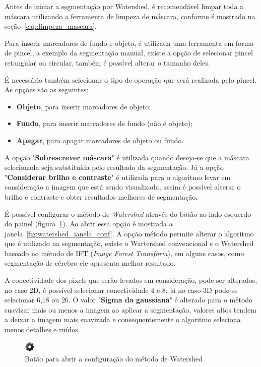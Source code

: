 Antes de iniciar a segmentação por Watershed, é recomendável limpar toda a máscara utilizando a ferramenta de limpeza de máscara, conforme é mostrado na seção~\ref{cap:limpeza_mascara}.

Para inserir marcadores de fundo e objeto, é utilizada uma ferramenta em forma de pincel, a exemplo da segmentação manual, existe a opção de selecionar pincel retangular ou circular, também é possível alterar o tamanho deles. 

É necessário também selecionar o tipo de operação que será realizada pelo pincel. As opções são as
seguintes:
\begin{itemize}
\item \textbf{Objeto}, para inserir marcadores de objeto;
\item \textbf{Fundo}, para inserir marcadores de fundo (não é objeto);
\item \textbf{Apagar}, para apagar marcadores de objeto ou fundo.
\end{itemize}

A opção "\textbf{Sobrescrever máscara}" é utilizada quando deseja-se que a máscara selecionada seja substituída pelo resultado da segmentação. Já a opção "\textbf{Considerar brilho e contraste}" é utilizada para o algoritmo levar em consideração a imagem que está sendo visualizada, assim é possível alterar o brilho e contraste e obter resultados melhores de segmentação.

É possível configurar o método de \textit{Watershed} através do botão ao lado esquerdo do painel (figura~\ref{fig:watershed_conf}). Ao abrir essa opção é mostrada a janela~\ref{fig:watershed_janela_conf}. A opção método permite alterar o algoritmo que é utilizado na segmentação, existe o Wartershed convencional e o Watershed baseado no método de IFT (\textit{Image Forest Transform}), em alguns casos, como segmentação de cérebro ele apresenta melhor resultado.

A conectividade dos pixels que serão levados em consideração, pode ser alterados, no caso 2D, é possível selecionar conectividade $4$ e $8$, já no caso 3D pode-se selecionar $6$,$18$ ou $26$. O valor "\textbf{Sigma da gaussiana}" é alterado para o método suavizar mais ou menos a imagem ao aplicar a segmentação, valores altos tendem a deixar a imagem mais suavizada e consequentemente o algoritmo seleciona menos detalhes e ruídos.

\begin{figure}[!htb]
\centering
\includegraphics[scale=0.5]{../user_guide_figures/icons/configuration.png}
\caption{Botão para abrir a configuração do método de Watershed}
\label{fig:watershed_conf}
\end{figure}

